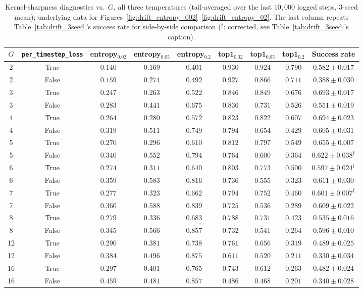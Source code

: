 \documentclass[11pt]{article}
\begin{document}
\begin{table}[H]
\centering
\small
\caption{Kernel-sharpness diagnostics vs.\ $G$, all three temperatures (tail-averaged over the last $10{,}000$ logged steps, 3-seed mean); underlying data for Figures~\ref{fig:drift_entropy_002}--\ref{fig:drift_entropy_02}. The last column repeats Table~\ref{tab:drift_3seed}'s success rate for side-by-side comparison ($^\dagger$: corrected, see Table~\ref{tab:drift_3seed}'s caption).}
\label{tab:drift_entropy}
\begin{tabular}{cccccccc c}
\toprule
$G$ & \texttt{per\_timestep\_loss} & entropy$_{0.02}$ & entropy$_{0.05}$ & entropy$_{0.2}$ & top1$_{0.02}$ & top1$_{0.05}$ & top1$_{0.2}$ & Success rate \\
\midrule
2  & True  & $0.140$ & $0.169$ & $0.401$ & $0.930$ & $0.924$ & $0.790$ & $0.582 \pm 0.017$ \\
2  & False & $0.159$ & $0.274$ & $0.492$ & $0.927$ & $0.866$ & $0.711$ & $0.388 \pm 0.030$ \\
3  & True  & $0.247$ & $0.263$ & $0.522$ & $0.846$ & $0.849$ & $0.676$ & $0.693 \pm 0.017$ \\
3  & False & $0.283$ & $0.441$ & $0.675$ & $0.836$ & $0.731$ & $0.526$ & $0.551 \pm 0.019$ \\
4  & True  & $0.264$ & $0.280$ & $0.572$ & $0.823$ & $0.822$ & $0.607$ & $0.694 \pm 0.023$ \\
4  & False & $0.319$ & $0.511$ & $0.749$ & $0.794$ & $0.654$ & $0.429$ & $0.605 \pm 0.031$ \\
5  & True  & $0.270$ & $0.296$ & $0.610$ & $0.812$ & $0.797$ & $0.549$ & $0.655 \pm 0.007$ \\
5  & False & $0.340$ & $0.552$ & $0.794$ & $0.764$ & $0.600$ & $0.364$ & $0.622 \pm 0.038^\dagger$ \\
6  & True  & $0.274$ & $0.311$ & $0.640$ & $0.803$ & $0.773$ & $0.500$ & $0.597 \pm 0.024^\dagger$ \\
6  & False & $0.359$ & $0.583$ & $0.816$ & $0.736$ & $0.555$ & $0.323$ & $0.611 \pm 0.030$ \\
7  & True  & $0.277$ & $0.323$ & $0.662$ & $0.794$ & $0.752$ & $0.460$ & $0.601 \pm 0.007^\dagger$ \\
7  & False & $0.360$ & $0.588$ & $0.839$ & $0.725$ & $0.536$ & $0.289$ & $0.609 \pm 0.022$ \\
8  & True  & $0.279$ & $0.336$ & $0.683$ & $0.788$ & $0.731$ & $0.423$ & $0.535 \pm 0.016$ \\
8  & False & $0.345$ & $0.566$ & $0.857$ & $0.732$ & $0.541$ & $0.264$ & $0.596 \pm 0.010$ \\
12 & True  & $0.290$ & $0.381$ & $0.738$ & $0.761$ & $0.656$ & $0.319$ & $0.489 \pm 0.025$ \\
12 & False & $0.384$ & $0.496$ & $0.875$ & $0.611$ & $0.520$ & $0.211$ & $0.330 \pm 0.034$ \\
16 & True  & $0.297$ & $0.401$ & $0.765$ & $0.743$ & $0.612$ & $0.263$ & $0.482 \pm 0.024$ \\
16 & False & $0.459$ & $0.481$ & $0.857$ & $0.486$ & $0.468$ & $0.201$ & $0.340 \pm 0.028$ \\
\bottomrule
\end{tabular}
\end{table}
\end{document}

